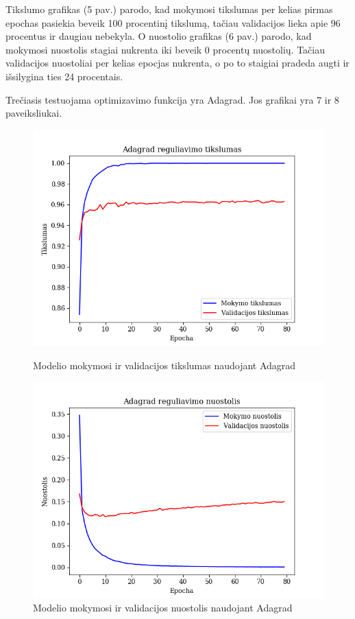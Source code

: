 \documentclass{VUMIFPSkursinis}
\begin{document}
Tikslumo grafikas (5 pav.) parodo, kad mokymosi tikslumas per kelias pirmas epochas pasiekia beveik 100 procentinį tikslumą, tačiau validacijos lieka apie 96 procentus ir daugiau nebekyla.
O nuostolio grafikas (6 pav.) parodo, kad mokymosi nuostolis stagiai nukrenta iki beveik 0 procentų nuostolių. Tačiau validacijos nuostoliai per kelias epocjas nukrenta, o po to staigiai pradeda augti ir išsilygina ties 24 procentais.

Trečiasis testuojama optimizavimo funkcija yra Adagrad. Jos grafikai yra 7 ir 8 paveiksliukai.

\begin{figure}[!htbp]
  \centering
  \begin{minipage}[b]{0.49\textwidth}
    \includegraphics[width=\textwidth]{img/FT/Adagrad_loss.png}
    \caption{Modelio mokymosi ir validacijos tikslumas naudojant Adagrad}
  \end{minipage}
  \begin{minipage}[b]{0.49\textwidth}
    \includegraphics[width=\textwidth]{img/FT/Adagrad_acc.png}
    \caption{Modelio mokymosi ir validacijos nuostolis naudojant Adagrad}
  \end{minipage}
\end{figure}
\end{document}
